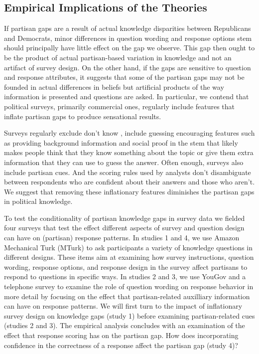 \documentclass[12pt, letterpaper]{article}
\begin{document}
\subsection*{Empirical Implications of the Theories}

If partisan gaps are a result of actual knowledge disparities between Republicans and Democrats, minor differences in question wording and response options stem should principally have little effect on the gap we observe. This gap then ought to be the product of actual partisan-based variation in knowledge and not an artifact of survey design. On the other hand, if the gaps are sensitive to question and response attributes, it suggests that some of the partisan gaps may not be founded in actual differences in beliefs but artificial products of the way information is presented and questions are asked. In particular, we contend that political surveys, primarily commercial ones, regularly include features that inflate partisan gaps to produce sensational results.

Surveys regularly exclude don't know \citep{luskin2011don}, include guessing encouraging features such as providing background information and social proof in the stem that likely makes people think that they know something about the topic
or give them extra information that they can use to guess the answer.
Often enough, surveys also include partisan cues.
And the scoring rules used by analysts don't disambiguate between respondents who are confident about their answers and those who aren't.
We suggest that removing these inflationary features diminishes the partisan gaps in political knowledge.

To test the conditionality of partisan knowledge gaps in survey data we fielded four surveys that test the effect different aspects of survey and question design can have on (partisan) response patterns. In studies 1 and 4, we use Amazon Mechanical Turk (MTurk) to ask participants a variety of knowledge questions in different designs. These items aim at examining how survey instructions, question wording, response options, and response design in the survey affect partisans to respond to questions in specific ways. In studies 2 and 3, we use YouGov and a telephone survey to examine the role of question wording on response behavior in more detail by focusing on the effect that partisan-related auxilliary information can have on response patterns. We will first turn to the impact of inflationary survey design on knowledge gaps (study 1) before examining partisan-related cues (studies 2 and 3). The empirical analysis concludes with an examination of the effect that response scoring has on the partisan gap. How does incorporating confidence in the correctness of a response affect the partisan gap (study 4)?
\end{document}
